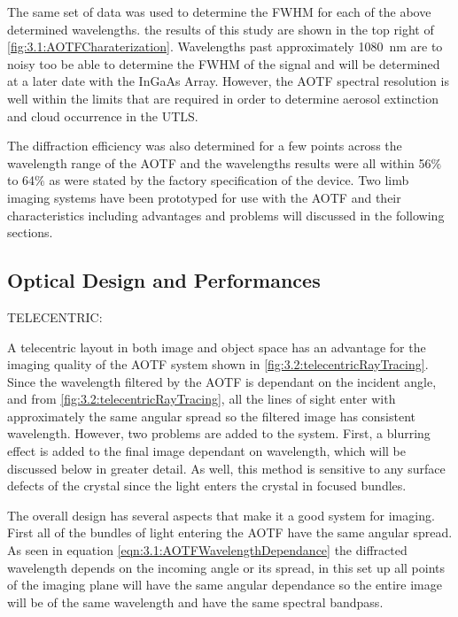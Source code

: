 \documentclass[12pt]{article}
\begin{document}
The same set of data was used to determine the FWHM for each of the above determined wavelengths. the results of this study are shown in the top right of \autoref{fig:3.1:AOTFCharaterization}. Wavelengths past approximately 1080~nm are to noisy too be able to determine the FWHM of the signal and will be determined at a later date with the InGaAs Array. However, the AOTF spectral resolution is well within the limits that are required in order to determine aerosol extinction and cloud occurrence in the UTLS.

The diffraction efficiency was also determined for a few points across the wavelength range of the AOTF and the wavelengths results were all within 56$\%$ to 64$\%$ as were stated by the factory specification of the device. Two limb imaging systems have been prototyped for use with the AOTF and their characteristics including advantages and problems will discussed in the following sections.

\subsection{Optical Design and Performances}

TELECENTRIC:

A telecentric layout in both image and object space has an advantage for the imaging quality of the AOTF system shown in \autoref{fig:3.2:telecentricRayTracing}. Since the wavelength filtered by the AOTF is dependant on the incident angle, and from \autoref{fig:3.2:telecentricRayTracing}, all the lines of sight enter with approximately the same angular spread so the filtered image has consistent wavelength. However, two problems are added to the system. First, a blurring effect is added to the final image dependant on wavelength, which will be discussed below in greater detail. As well, this method is sensitive to any surface defects of the crystal since the light enters the crystal in focused bundles.

The overall design has several aspects that make it a good system for imaging. First all of the bundles of light entering the AOTF have the same angular spread. As seen in equation \autoref{eqn:3.1:AOTFWavelengthDependance} the diffracted wavelength depends on the incoming angle or its spread, in this set up all points of the imaging plane will have the same angular dependance so the entire image will be of the same wavelength and have the same spectral bandpass.

\end{document}
